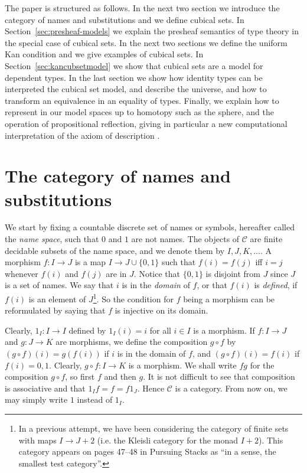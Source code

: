 \documentclass[10pt,a4paper]{article}
\newcommand{\CC}{{\mathcal C}}
\newcommand{\set}[1]{\{#1\}}
\begin{document}

The paper is structured as follows. In the next two section we introduce the category of 
names and substitutions and we define cubical sets.
In Section~\ref{sec:presheaf-models} we explain the presheaf semantics of type theory
in the special case of cubical sets. In the next two sections we define
the uniform Kan condition and we give examples of cubical sets.
In Section~\ref{sec:kancubsetmodel} we show that cubical
sets are a model for dependent types.  In the last section we show how
identity types can be interpreted the cubical set model, and describe
the universe, and how to transform an equivalence in an equality of
types.  Finally, we explain how to represent in our model spaces up to
homotopy such as the sphere, and the operation of propositional
reflection, giving in particular a new computational interpretation of
the axiom of description \cite{Russell}.

\section{The category of names and substitutions}

 We start by fixing a countable discrete set of names or symbols, hereafter called the \emph{name space},
such that $0$ and $1$ are not names.
The objects of $\CC$ are finite decidable subsets of the name space,
and we denote them by $I,J,K,\dots$.
A morphism $f:I\to J$ is a map $I \to J\cup \set{0,1}$ such that $f(i) = f(j)$ if{f} $i=j$ whenever
$f(i)$ and $f(j)$ are in $J$. Notice that $\set{0,1}$ is disjoint from $J$ since $J$ is a set of
names. We say that $i$ is in the \emph{domain} of $f$, or that $f(i)$ is \emph{defined},
if $f(i)$ is an element of $J$\footnote%
{In a previous attempt, we have been considering the category of finite sets
with maps $I \to J+2$ (i.e. the Kleisli category for the monad $I+2$).
This category appears on pages 47--48 in Pursuing Stacks
\cite{Grothendieck} as ``in a sense, the smallest test category''.}.
So the condition for $f$ being a morphism can be reformulated by saying that $f$ is injective on its domain.

Clearly, $1_I : I\to I$ defined by $1_I(i) = i$ for all $i\in I$ is a morphism.
If $f:I\to J$ and $g:J\to K$ are morphisms, we define the composition $g\circ f$ by
$(g\circ f)(i) = g(f(i))$ if $i$ is in the domain of $f$, and $(g\circ f)(i) = f(i)$ if $f(i)= 0,1$.
Clearly, $g\circ f: I\to K$ is a morphism.
We shall write $fg$ for the composition $g\circ f$, so first $f$ and then $g$.
It is not difficult to see that composition is associative and that $1_I f = f = f 1_J$.
Hence $\CC$ is a category. From now on, we may simply write $1$ instead of $1_I$.
\end{document}
